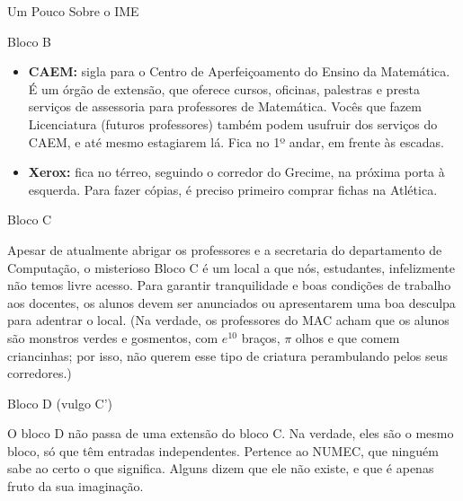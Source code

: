 \begin{secao}{Um Pouco Sobre o IME}
\begin{subsecao}{Bloco B}
\begin{itemize}
A Seção de Alunos fica na sala 12, ao lado do CEC e das mesas azuis.
\begin{itemize}
\item[-] Horário de atendimento: 10:00 às 13:00 e 18:00 às 20:00 de segunda a sexta.
\item[-] E-mail: \tt{saol@ime.usp}
\item[-] Telefone: \tt{11 3091-6149} e \tt{11 3091-6279}
\end{itemize}

\item {\bf CAEM:} sigla para o Centro de Aperfeiçoamento do Ensino da Matemática.
É um órgão de extensão, que oferece cursos, oficinas, palestras e presta serviços
de assessoria para professores de Matemática. Vocês que fazem Licenciatura (futuros
professores) também podem usufruir dos serviços do CAEM, e até mesmo estagiarem lá.
Fica no 1º andar, em frente às escadas.

\item{\bf Xerox:} fica no térreo, seguindo o corredor do Grecime, na próxima
                  porta à esquerda. Para fazer cópias, é preciso primeiro
                  comprar fichas na Atlética.
\end{itemize}

\end{subsecao}

\begin{subsecao}{Bloco C}

Apesar de atualmente abrigar os professores e a secretaria do departamento de
Computação, o misterioso Bloco C é um local a que nós, estudantes, infelizmente não
temos livre acesso. Para garantir tranquilidade e boas condições de trabalho aos
docentes, os alunos devem ser anunciados ou apresentarem uma boa desculpa para
adentrar o local. (Na verdade, os professores do MAC acham que os alunos são monstros
verdes e gosmentos, com $e^{10}$ braços, $\pi$ olhos e que comem criancinhas;
por isso, não querem esse tipo de criatura perambulando pelos seus corredores.)

\end{subsecao}

\begin{subsecao}{Bloco D (vulgo C')}

O bloco D não passa de uma extensão do bloco C. Na verdade, eles são o mesmo bloco,
só que têm entradas independentes. Pertence ao NUMEC, que ninguém sabe ao certo
o que significa. Alguns dizem que ele não existe, e que é apenas fruto da sua
imaginação.


\end{subsecao}
\end{secao}
